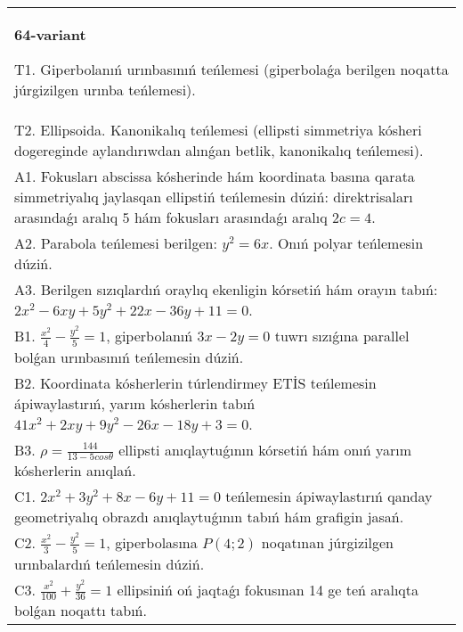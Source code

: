 \documentclass{article}
\begin{document}
\begin{tabular}{m{17cm}}
\textbf{64-variant}
\newline

T1. Giperbolanıń urınbasınıń teńlemesi (giperbolaǵa berilgen noqatta júrgizilgen urınba teńlemesi).\\

T2. Ellipsoida. Kanonikalıq teńlemesi (ellipsti simmetriya kósheri dogereginde aylandırıwdan alınǵan betlik, kanonikalıq teńlemesi).\\

A1. Fokusları abscissa kósherinde hám koordinata basına qarata simmetriyalıq jaylasqan ellipstiń teńlemesin dúziń: direktrisaları arasındaǵı aralıq $5$ hám fokusları arasındaǵı aralıq $2 c=4$.\\

A2. Parabola teńlemesi berilgen: $y^2=6 x$. Onıń polyar teńlemesin dúziń.\\

A3. Berilgen sızıqlardıń oraylıq ekenligin kórsetiń hám orayın tabıń: $2 x^{2}-6 xy+5 y^{2}+22 x-36 y+11=0$.\\

B1. $\frac{x^{2}}{4} - \frac{y^{2}}{5} = 1$, giperbolanıń $3x - 2y = 0$ tuwrı sızıǵına parallel bolǵan urınbasınıń teńlemesin dúziń.  \\

B2. Koordinata kósherlerin túrlendirmey ETİS teńlemesin ápiwaylastırıń, yarım kósherlerin tabıń $41x^{2} + 2xy + 9y^{2} - 26x - 18y + 3 = 0$.  \\

B3. $\rho = \frac{144}{13 - 5cos\theta}$ ellipsti anıqlaytuǵının kórsetiń hám onıń yarım kósherlerin anıqlań.\\

C1. $2x^{2} + 3y^{2} + 8x - 6y + 11 = 0$ teńlemesin ápiwaylastırıń qanday geometriyalıq obrazdı anıqlaytuǵının tabıń hám grafigin jasań.  \\

C2. $\frac{x^{2}}{3} - \frac{y^{2}}{5} = 1$, giperbolasına $P(4;2)$ noqatınan júrgizilgen urınbalardıń teńlemesin dúziń.  \\

C3. $\frac{x^{2}}{100} + \frac{y^{2}}{36} = 1$ ellipsiniń oń jaqtaǵı fokusınan 14 ge teń aralıqta bolǵan noqattı tabıń.  \\

\end{tabular}
\vspace{1cm}
\end{document}
